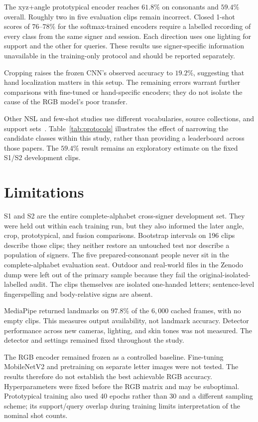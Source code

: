 \documentclass[11pt,a4paper]{article}
\begin{document}
The xyz+angle prototypical encoder reaches $61.8\%$ on consonants and $59.4\%$ overall. Roughly two in five evaluation clips remain incorrect. Closed 1-shot scores of $76$--$78\%$ for the softmax-trained encoders require a labelled recording of every class from the same signer and session. Each direction uses one lighting for support and the other for queries. These results use signer-specific information unavailable in the training-only protocol and should be reported separately.

Cropping raises the frozen CNN's observed accuracy to $19.2\%$, suggesting that hand localization matters in this setup. The remaining errors warrant further comparisons with fine-tuned or hand-specific encoders; they do not isolate the cause of the RGB model's poor transfer.

Other NSL and few-shot studies use different vocabularies, source collections, and support sets~\cite{heuju2022word,shrestha2024mediapipe,chamachot2026geometry}. Table~\ref{tab:protocols} illustrates the effect of narrowing the candidate classes within this study, rather than providing a leaderboard across those papers. The $59.4\%$ result remains an exploratory estimate on the fixed S1/S2 development clips.

\section{Limitations}

S1 and S2 are the entire complete-alphabet cross-signer development set. They were held out within each training run, but they also informed the later angle, crop, prototypical, and fusion comparisons. Bootstrap intervals on 196 clips describe those clips; they neither restore an untouched test nor describe a population of signers. The five prepared-consonant people never sit in the complete-alphabet evaluation seat. Outdoor and real-world files in the Zenodo dump were left out of the primary sample because they fail the original-isolated-labelled audit. The clips themselves are isolated one-handed letters; sentence-level fingerspelling and body-relative signs are absent.

MediaPipe returned landmarks on $97.8\%$ of the $6{,}000$ cached frames, with no empty clips. This measures output availability, not landmark accuracy. Detector performance across new cameras, lighting, and skin tones was not measured. The detector and settings remained fixed throughout the study.

The RGB encoder remained frozen as a controlled baseline. Fine-tuning MobileNetV2 and pretraining on separate letter images were not tested. The results therefore do not establish the best achievable RGB accuracy. Hyperparameters were fixed before the RGB matrix and may be suboptimal. Prototypical training also used 40 epochs rather than 30 and a different sampling scheme; its support/query overlap during training limits interpretation of the nominal shot counts.
\end{document}
